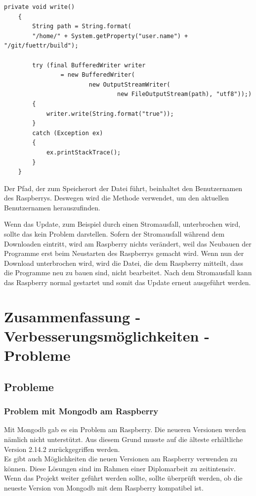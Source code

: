 \begin{lstlisting}[style=JavaStyle, caption= Writer]
    private void write()
    {
        String path = String.format(
        "/home/" + System.getProperty("user.name") + "/git/fuettr/build");

        try (final BufferedWriter writer
                = new BufferedWriter(
                        new OutputStreamWriter(
                                new FileOutputStream(path), "utf8"));)
        {
            writer.write(String.format("true"));
        }
        catch (Exception ex)
        {
            ex.printStackTrace();
        }
    }
\end{lstlisting}
Der Pfad, der zum Speicherort der Datei führt, beinhaltet den Benutzernamen des Raspberrys. Deswegen wird die Methode \textbf{} verwendet, um den aktuellen Benutzernamen herauszufinden.

\vspace{10pt}

Wenn das Update, zum Beispiel durch einen Stromausfall, unterbrochen wird, sollte das kein Problem darstellen. Sofern der Stromausfall während dem Downloaden eintritt, wird am Raspberry nichts verändert, weil das Neubauen der Programme erst beim Neustarten des Raspberrys gemacht wird. Wenn nun der Download unterbrochen wird, wird die Datei, die dem Raspberry mitteilt, dass die Programme neu zu bauen sind, nicht bearbeitet. Nach dem Stromausfall kann das Raspberry normal gestartet und somit das Update erneut ausgeführt werden.

\newpage

\section{Zusammenfassung - Verbesserungsmöglichkeiten - Probleme}

\subsection{Probleme}
\subsubsection{Problem mit Mongodb am Raspberry}
Mit Mongodb gab es ein Problem am Raspberry. Die neueren Versionen werden nämlich nicht unterstützt. Aus diesem Grund musste auf die älteste erhältliche Version 2.14.2 zurückgegriffen werden.
\\ Es gibt auch Möglichkeiten die neuen Versionen am Raspberry verwenden zu können. Diese Lösungen sind im Rahmen einer Diplomarbeit zu zeitintensiv.
\\ Wenn das Projekt weiter geführt werden sollte, sollte überprüft werden, ob die neueste Version von Mongodb mit dem Raspberry kompatibel ist.
